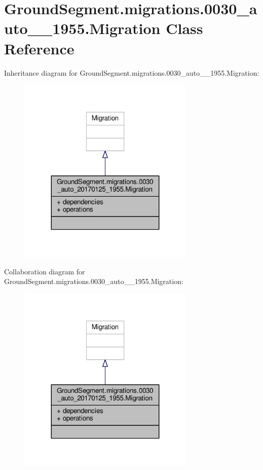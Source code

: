 \hypertarget{class_ground_segment_1_1migrations_1_10030__auto__20170125__1955_1_1_migration}{}\section{Ground\+Segment.\+migrations.0030\+\_\+auto\+\_\+\_\+1955.Migration Class Reference}
\label{class_ground_segment_1_1migrations_1_10030__auto__20170125__1955_1_1_migration}


Inheritance diagram for Ground\+Segment.\+migrations.0030\+\_\+auto\+\_\+\_\+1955.Migration\+:\nopagebreak
\begin{figure}[H]
\begin{center}
\leavevmode
\includegraphics[width=239pt]{class_ground_segment_1_1migrations_1_10030__auto__20170125__1955_1_1_migration__inherit__graph}
\end{center}
\end{figure}


Collaboration diagram for Ground\+Segment.\+migrations.0030\+\_\+auto\+\_\+\_\+1955.Migration\+:\nopagebreak
\begin{figure}[H]
\begin{center}
\leavevmode
\includegraphics[width=239pt]{class_ground_segment_1_1migrations_1_10030__auto__20170125__1955_1_1_migration__coll__graph}
\end{center}
\end{figure}
